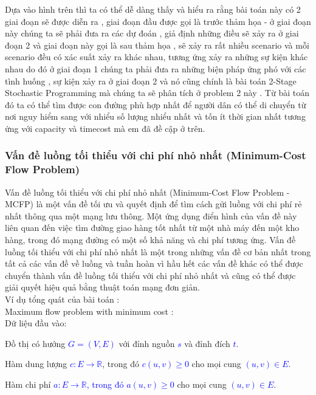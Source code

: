 \documentclass[a4paper]{article}
\begin{document}
 
Dựa vào hình trên thì ta có thể dễ dàng thấy và hiểu ra rằng bài toán này có 2 giai đoạn sẽ được diễn ra , giai đoạn đầu được gọi là trước thảm họa - ở giai đoạn này chúng ta sẽ phải đưa ra các dự đoán , giả định những điều sẽ xảy ra ở giai đoạn 2 và giai đoạn này gọi là sau thảm họa , sẽ xảy ra rất nhiều scenario và mỗi scenario đều có xác suất xảy ra khác nhau, tương ứng xảy ra những sự kiện khác nhau do đó ở giai đoạn 1 chúng ta phải đưa ra những biện pháp ứng phó với các tình huống , sự kiện xảy ra ở giai đoạn 2 và nó cũng chính là bài toán 2-Stage Stochastic Programming mà chúng ta sẽ phân tích ở problem 2 này . Từ bài toán đó ta có thể tìm được con đường phù hợp nhất để người dân có thể di chuyển từ nơi nguy hiểm sang với nhiểu số lượng nhiểu nhất và tốn ít thời gian nhất tương ứng với capacity và timecost mà em đã đề cập ở trên.
 \subsubsection{Vấn đề luồng tối thiểu với chi phí nhỏ nhất (Minimum-Cost Flow Problem)}
Vấn đề luồng tối thiểu với chi phí nhỏ nhất (Minimum-Cost Flow Problem - MCFP) là một vấn đề tối ưu và quyết định để tìm cách gửi luồng với chi phí rẻ nhất thông qua một mạng lưu thông. Một ứng dụng điển hình của vấn đề này liên quan đến việc tìm đường giao hàng tốt nhất từ một nhà máy đến một kho hàng, trong đó mạng đường có một số khả năng và chi phí tương ứng. Vấn đề luồng tối thiểu với chi phí nhỏ nhất là một trong những vấn đề cơ bản nhất trong tất cả các vấn đề về luồng và tuần hoàn vì hầu hết các vấn đề khác có thể được chuyển thành vấn đề luồng tối thiểu với chi phí nhỏ nhất và cũng có thể được giải quyết hiệu quả bằng thuật toán mạng đơn giản.\\
Ví dụ tổng quát của bài toán :\\
Maximum flow problem with minimum cost :\\
Dữ liệu đầu vào:\\ 
\begin{minipage}{0.8\textwidth}
    \setlength{\parindent}{20pt}
    Đồ thị có hướng \textcolor{blue}{$G = (V, E)$} với đỉnh nguồn \textcolor{blue}{$s$} và đỉnh đích \textcolor{blue}{$t$}.

Hàm dung lượng \textcolor{blue}{$c: E \rightarrow \mathbb{R}$}, trong đó \textcolor{blue}{$c(u, v) \geq 0$} cho mọi cung \textcolor{blue}{$(u, v) \in E$}.

Hàm chi phí \textcolor{blue}{$a: E \rightarrow \mathbb{R}$, trong đó $a(u, v) \geq 0$} cho mọi cung \textcolor{blue}{$(u, v) \in E$}.
\end{minipage}\\
\end{document}
